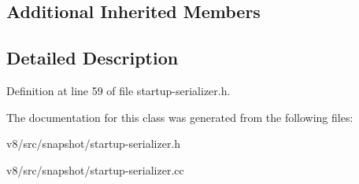 \subsection*{Additional Inherited Members}


\subsection{Detailed Description}


Definition at line 59 of file startup-\/serializer.\+h.



The documentation for this class was generated from the following files\+:\begin{DoxyCompactItemize}
\item 
v8/src/snapshot/startup-\/serializer.\+h\item 
v8/src/snapshot/startup-\/serializer.\+cc\end{DoxyCompactItemize}
